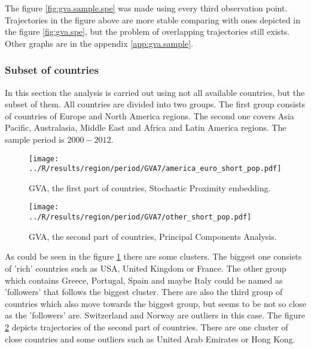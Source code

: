 \documentclass[a4paper]{article}
\begin{document}
The figure \ref{fig:gva.sample.spe} was made using every third observation point. Trajectories in the figure above are more stable comparing with ones depicted in the figure \ref{fig:gva.spe}, but the problem of overlapping trajectories still exists. Other graphs are in the appendix \ref{app:gva.sample}.

\subsubsection{Subset of countries}
\label{sec:gva.region}
In this section the analysis is carried out using not all available countries, but the subset of them. All countries are divided into two groups. The first group consists of countries of Europe and North America regions. The second one covers Asia Pacific, Australasia, Middle East and Africa and Latin America regions. The sample period is $2000-2012$.

\begin{figure}[!htbp]
\begin{center}
\texttt{[image: ../R/results/region/period/GVA7/america\_euro\_short\_pop.pdf]}
\caption{GVA, the first part of countries, Stochastic Proximity embedding.}
\label{fig:gva.region.first.spe}
\end{center}
\end{figure}

\begin{figure}[!htbp]
\begin{center}
\texttt{[image: ../R/results/region/period/GVA7/other\_short\_pop.pdf]}
\caption{GVA, the second part of countries, Principal Components Analysis.}
\label{fig:gva.region.second.pca}
\end{center}
\end{figure}

As could be seen in the figure \ref{fig:gva.region.first.spe} there are some clusters. The biggest one consists of 'rich' countries such as USA, United Kingdom or France. The other group which contains Greece, Portugal, Spain and maybe Italy could be named as 'followers' that follows the biggest cluster. There are also the third group of countries which also move towards the biggest group, but seems to be not so close as the 'followers' are. Switzerland and Norway are outliers in this case. The figure \ref{fig:gva.region.second.pca} depicts trajectories of the second part of countries. There are one cluster of close countries and some outliers such as United Arab Emirates or Hong Kong.
\end{document}
